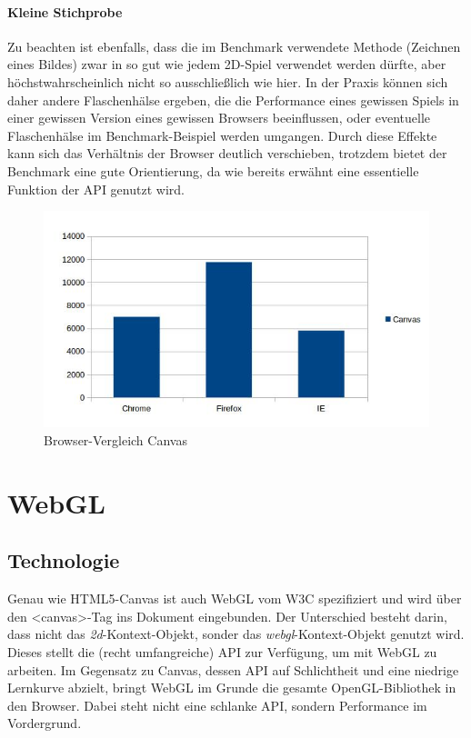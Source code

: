 \documentclass[a4paper, 12pt]{article}
\begin{document}
\paragraph{Kleine Stichprobe} Zu beachten ist ebenfalls, dass die im Benchmark verwendete Methode (Zeichnen eines Bildes) zwar in so gut wie jedem 2D-Spiel verwendet werden dürfte, aber höchstwahrscheinlich nicht so ausschließlich wie hier. In der Praxis können sich daher andere Flaschenhälse ergeben, die die Performance eines gewissen Spiels in einer gewissen Version eines gewissen Browsers beeinflussen, oder eventuelle Flaschenhälse im Benchmark-Beispiel werden umgangen. Durch diese Effekte kann sich das Verhältnis der Browser deutlich verschieben, trotzdem bietet der Benchmark eine gute Orientierung, da wie bereits erwähnt eine essentielle Funktion der API genutzt wird.
\begin{figure}[H]
	\includegraphics[width=\textwidth]{assets/browser_comp_canvas} 
	\caption{Browser-Vergleich Canvas}
	\label{browser_comp_canvas}
\end{figure}
\newpage
\section{WebGL}
\subsection{Technologie}
Genau wie HTML5-Canvas ist auch WebGL vom W3C spezifiziert und wird über den <canvas>-Tag ins Dokument eingebunden. Der Unterschied besteht darin, dass nicht das \emph{2d}-Kontext-Objekt, sonder das \emph{webgl}-Kontext-Objekt genutzt wird. Dieses stellt die (recht umfangreiche) API zur Verfügung, um mit WebGL zu arbeiten. Im Gegensatz zu Canvas, dessen API auf Schlichtheit und eine niedrige Lernkurve abzielt, bringt WebGL im Grunde die gesamte OpenGL-Bibliothek in den Browser. Dabei steht nicht eine schlanke API, sondern Performance im Vordergrund.
\end{document}
